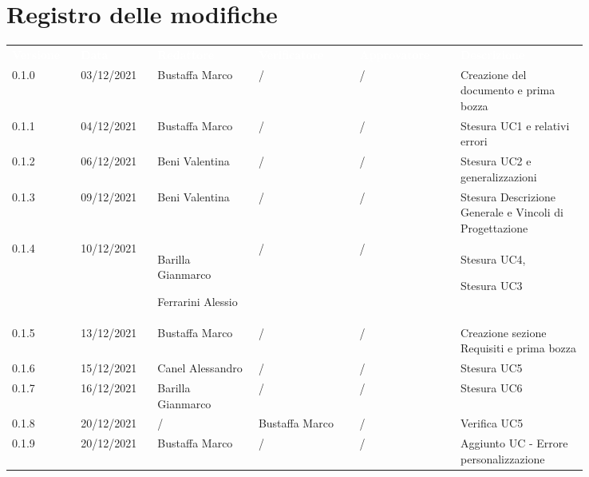 \section*{Registro delle modifiche}

{\renewcommand{\arraystretch}{1.5}
\scriptsize
\begin{tabular}{p{0.10\linewidth}p{0.10\linewidth}p{0.15\linewidth}p{0.15\linewidth}p{0.15\linewidth}p{0.19\linewidth}}
	\rowcolor[RGB]{33, 73, 50}
	\textcolor{white}{\textbf{Versione}} & \textcolor{white}{\textbf{Data}} & 
	\textcolor{white}{\textbf{Redattore}} & \textcolor{white}{\textbf{Verificatore}} & 
	\textcolor{white}{\textbf{Approvatore}} & \textcolor{white}{\textbf{Descrizione}}\\
	\rowcolor[RGB]{216, 235, 171}
	0.1.0 & 03/12/2021 & Bustaffa Marco& / &/& Creazione del documento e prima bozza\\
	\rowcolor[RGB]{233, 245, 206}
	0.1.1 & 04/12/2021 & Bustaffa Marco& / &/& Stesura UC1 e relativi errori\\
	\rowcolor[RGB]{216, 235, 171}
	0.1.2 & 06/12/2021 & Beni Valentina& / &/& Stesura UC2 e generalizzazioni\\
	\rowcolor[RGB]{233, 245, 206}
	0.1.3 & 09/12/2021 & Beni Valentina& / &/& Stesura Descrizione Generale e Vincoli di Progettazione \\
	\rowcolor[RGB]{216, 235, 171}
	0.1.4 & 10/12/2021 & Barilla Gianmarco \par Ferrarini Alessio& / &/& Stesura UC4, \par Stesura UC3 \\
	\rowcolor[RGB]{233, 245, 206}
	0.1.5 & 13/12/2021 & Bustaffa Marco& / &/& Creazione sezione Requisiti e prima bozza\\
	\rowcolor[RGB]{216, 235, 171}
	0.1.6 & 15/12/2021 & Canel Alessandro& /&/& Stesura UC5\\
	\rowcolor[RGB]{233, 245, 206}
	0.1.7 & 16/12/2021 & Barilla Gianmarco& / &/& Stesura UC6\\
	\rowcolor[RGB]{216, 235, 171}
	0.1.8 & 20/12/2021 & / & Bustaffa Marco& /& Verifica UC5\\
	\rowcolor[RGB]{233, 245, 206}
	0.1.9 & 20/12/2021 & Bustaffa Marco& / &/& Aggiunto UC - Errore personalizzazione

\end{tabular}	
}